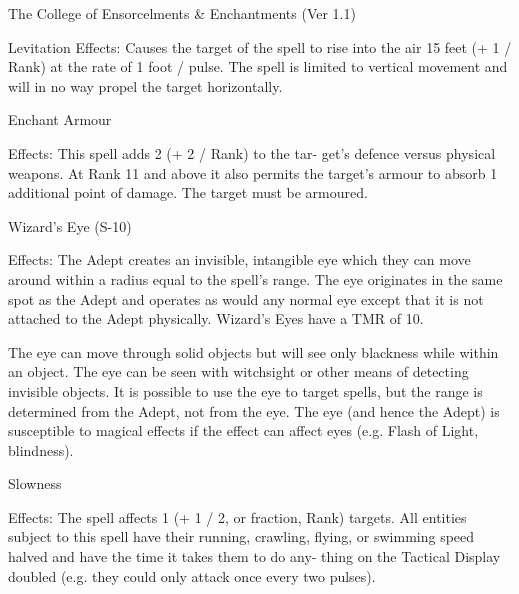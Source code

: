 \begin{Chapter}{The College of Ensorcelments \& Enchantments (Ver 1.1)}
\begin{spell}[S-8]{Levitation }
Effects:  Causes  the  target  of  the  spell  to  rise  into 
the  air  15  feet  (+  1  /  Rank)  at  the  rate  of  1  foot  / 
pulse.  The  spell  is  limited  to  vertical  movement 
and will in no way propel the target horizontally. 

\end{spell}

\begin{spell}[S-9]{Enchant Armour }

Effects:  This  spell  adds  2  (+  2  /  Rank)  to  the  tar-
get’s defence versus physical weapons. At Rank 11 
and  above  it  also  permits  the  target’s  armour  to 
absorb  1  additional  point  of  damage.  The  target 
must be armoured. 

Wizard’s Eye (S-10) 

Effects:  The  Adept  creates  an  invisible,  intangible 
eye  which  they  can  move  around  within  a  radius 
equal to the spell’s range. The eye originates in the 
same spot as the Adept and operates as would any 
normal  eye  except  that  it  is  not  attached  to  the 
Adept  physically.  Wizard’s  Eyes  have  a  TMR  of 
10. 

The  eye  can  move  through  solid  objects  but  will 
see only blackness while within an object. The eye 
can  be  seen  with  witchsight  or  other  means  of 
detecting invisible objects. It is possible to use the 
eye  to  target  spells,  but  the  range  is  determined 
from  the  Adept,  not  from  the  eye.  The  eye  (and 
hence the Adept) is susceptible to magical effects if 
the  effect  can  affect  eyes  (e.g.  Flash  of  Light, 
blindness). 

\end{spell}

\begin{spell}[S-11]{Slowness }

Effects:  The  spell  affects  1  (+  1  /  2,  or  fraction, 
Rank) targets. All entities subject to this spell have 
their running, crawling, flying, or swimming speed 
halved  and  have  the  time  it  takes  them to  do  any-
thing  on  the  Tactical  Display  doubled  (e.g.  they 
could only attack once every two pulses). 


\end{spell}
\end{Chapter}
